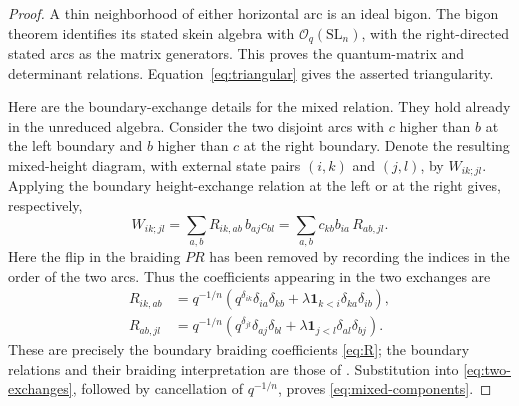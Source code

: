 \documentclass[11pt]{article}
\theoremstyle{remark}
\newcommand{\OO}{\mathcal O_q(\mathrm{SL}_n)}
\newcommand{\ind}{\mathbf 1}
\begin{document}
\begin{proof}
A thin neighborhood of either horizontal arc is an ideal bigon.
The bigon theorem \cite[Theorem~6.3]{LS} identifies its stated skein
algebra with $\OO$, with the right-directed stated arcs as the
matrix generators.  This proves the quantum-matrix and determinant
relations.  Equation~\eqref{eq:triangular} gives the asserted
triangularity.


Here are the boundary-exchange details for the mixed relation.
They hold already in the unreduced algebra.  Consider the two
disjoint arcs with $c$ higher than $b$ at the left boundary and $b$
higher than $c$ at the right boundary.  Denote the resulting
mixed-height diagram, with external state pairs $(i,k)$ and
$(j,l)$, by $W_{ik;jl}$.  Applying the boundary height-exchange
relation at the left or at the right gives, respectively,
\begin{equation}\label{eq:two-exchanges}
 W_{ik;jl}
   =\sum_{a,b}R_{ik,ab}\,b_{aj}c_{bl}
   =\sum_{a,b}c_{kb}b_{ia}\,R_{ab,jl}.
\end{equation}
Here the flip in the braiding $PR$ has been removed by recording
the indices in the order of the two arcs.  Thus the coefficients
appearing in the two exchanges are
\[
 \begin{split}
 R_{ik,ab}
 &=q^{-1/n}\left(
      q^{\delta_{ik}}\delta_{ia}\delta_{kb}
      +\lambda\ind_{k<i}\delta_{ka}\delta_{ib}
   \right),\\
 R_{ab,jl}
 &=q^{-1/n}\left(
      q^{\delta_{jl}}\delta_{aj}\delta_{bl}
      +\lambda\ind_{j<l}\delta_{al}\delta_{bj}
   \right).
 \end{split}
\]
These are precisely the boundary braiding coefficients
\eqref{eq:R}; the boundary relations and their braiding
interpretation are those of \cite[Section~4 and Theorem~6.4]{LS}.
Substitution into \eqref{eq:two-exchanges}, followed by cancellation
of $q^{-1/n}$, proves \eqref{eq:mixed-components}.


\end{proof}
\end{document}
